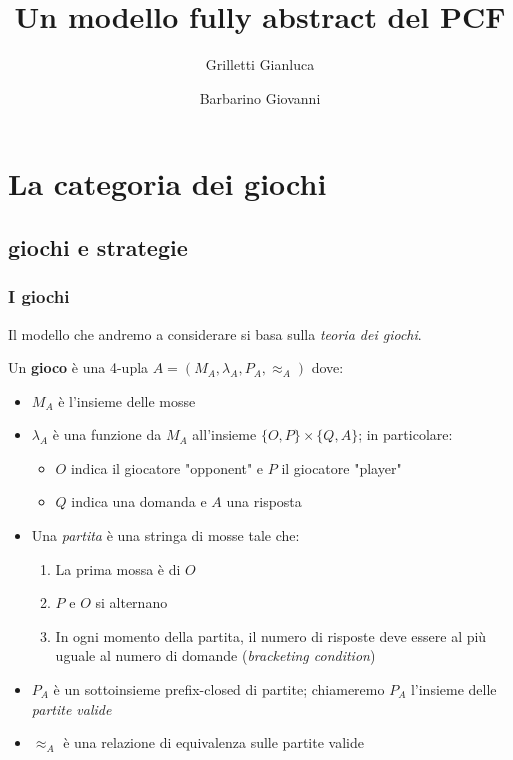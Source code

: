 \documentclass{beamer}
\title{Un modello fully abstract del PCF}
\author{Grilletti Gianluca \and Barbarino Giovanni}
\institute[Unipi]{Università di Pisa}
\begin{document}
\small


\begin{frame}
	\maketitle
	
\end{frame}

\section{La categoria dei giochi}


\subsection{giochi e strategie}

\begin{frame}
	\frametitle{I giochi}
	
	Il modello che andremo a considerare si basa sulla \emph{teoria dei giochi}.
	
	
	Un \textbf{gioco} è una 4-upla $A=( M_A , \lambda_A , P_A , \approx_A )$ dove:
	\begin{itemize}
	\item<2-> $M_A$ è l'insieme delle mosse
	\item<3-> $\lambda_A$ è una funzione da $M_A$ all'insieme $\{ O,P\} \times \{Q,A\}$; in particolare:
		\begin{itemize}
		\item $O$ indica il giocatore "opponent" e $P$ il giocatore "player"
		\item $Q$ indica una domanda e $A$ una risposta
		\end{itemize}
	\item<4-> Una \textit{partita} è una stringa di mosse tale che:
		\begin{enumerate}
		\item La prima mossa è di $O$
		\item $P$ e $O$ si alternano
		\item In ogni momento della partita, il numero di risposte deve essere al più uguale al numero di domande (\emph{bracketing condition})
		\end{enumerate}
	\item<5-> $P_A$ è un sottoinsieme prefix-closed di partite; chiameremo $P_A$ l'insieme delle \textit{partite valide}
	\item<6->  $\approx_A$ è una relazione di equivalenza sulle partite valide
	\end{itemize}
	
	
\end{frame}
\end{document}
